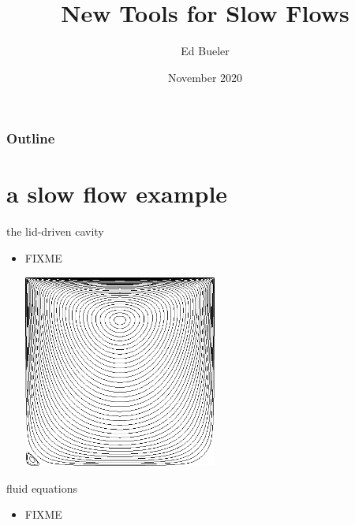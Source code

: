 \documentclass[10pt,hyperref,dvipsnames]{beamer}
\title{New Tools for Slow Flows}
\author{Ed Bueler}
\institute[UAF]{University of Alaska Fairbanks}
\date{November 2020}
\begin{document}
\beamertemplatenavigationsymbolsempty

\begin{frame}
  \maketitle
\end{frame}

\begin{frame}
  \frametitle{Outline}
  \tableofcontents[hideallsubsections]
\end{frame}


\section{a slow flow example}

\begin{frame}{the lid-driven cavity}

\begin{itemize}
\item FIXME

\begin{center}
\includegraphics[width=0.5\textwidth]{figs/eddies1.png}
\end{center}
\end{itemize}
\end{frame}


\begin{frame}{fluid equations}

\begin{itemize}
\item FIXME
\end{itemize}
\end{frame}
\end{document}
